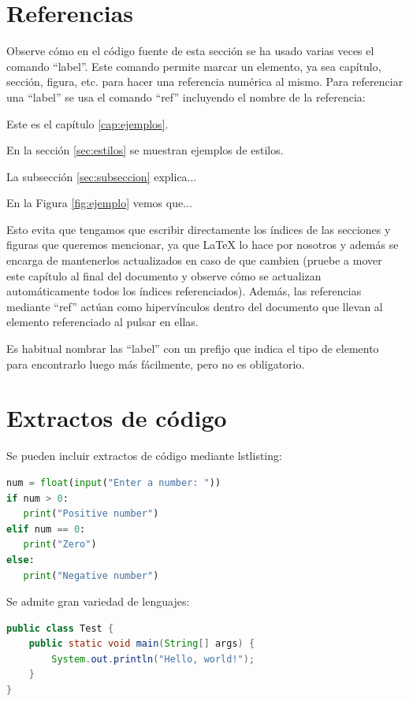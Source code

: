 \section{Referencias}
Observe cómo en el código fuente de esta sección se ha usado varias veces el comando ``label''. Este comando permite marcar un elemento, ya sea capítulo, sección, figura, etc. para hacer una referencia numérica al mismo. Para referenciar una ``label'' se usa el comando ``ref'' incluyendo el nombre de la referencia:

Este es el capítulo \ref{cap:ejemplos}.

En la sección \ref{sec:estilos} se muestran ejemplos de estilos.

La subsección \ref{sec:subseccion} explica...

En la Figura \ref{fig:ejemplo} vemos que...

Esto evita que tengamos que escribir directamente los índices de las secciones y figuras que queremos mencionar, ya que LaTeX lo hace por nosotros y además se encarga de mantenerlos actualizados en caso de que cambien (pruebe a mover este capítulo al final del documento y observe cómo se actualizan automáticamente todos los índices referenciados). Además, las referencias mediante ``ref'' actúan como hipervínculos dentro del documento que llevan al elemento referenciado al pulsar en ellas.

Es habitual nombrar las ``label'' con un prefijo que indica el tipo de elemento para encontrarlo luego más fácilmente, pero no es obligatorio.

\section{Extractos de código}

Se pueden incluir extractos de código mediante lstlisting:

\begin{lstlisting}[language=Python, caption={Código Python}, label={cod:python}, captionpos=b]
num = float(input("Enter a number: "))
if num > 0:
   print("Positive number")
elif num == 0:
   print("Zero")
else:
   print("Negative number")
\end{lstlisting}

Se admite gran variedad de lenguajes:

\begin{lstlisting}[language=Java, caption={Código Java}, label={cod:java}, captionpos=b]
public class Test {
    public static void main(String[] args) {
        System.out.println("Hello, world!");
    }
}
\end{lstlisting}

